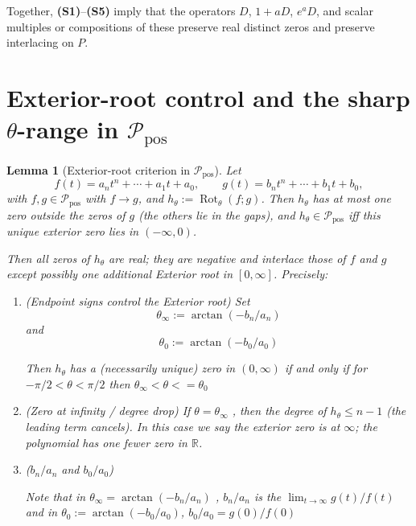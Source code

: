 \documentclass[11pt]{article}
\theoremstyle{breakdef}
\newtheorem{lemma}[theorem]{Lemma}
\begin{document}
Together, \textbf{(S1)}--\textbf{(S5)} imply that the operators
$D$, $1+aD$, $e^aD$, and scalar multiples or
compositions of these preserve real distinct zeros and preserve
interlacing on $P$.


\section{Exterior-root control and the sharp $\theta$-range in $\mathcal{P}_{\mathrm{pos}}$}

\begin{lemma}[Exterior-root criterion in $\mathcal{P}_{\mathrm{pos}}$]\label{lem:exterior-root-Ppos}
Let 
\[
f(t)=a_n t^n+\cdots+a_1 t+a_0,\qquad 
g(t)=b_n t^n+\cdots+b_1 t+b_0,
\]
with  $f,g\in\mathcal{P}_{\mathrm{pos}}$ with $f\to g$, and $h_\theta:=\operatorname{Rot}_\theta(f;g)$. Then $h_\theta$ has at most one zero outside the zeros of $g$ (the others lie in the gaps), and $h_\theta\in\mathcal{P}_{\mathrm{pos}}$ iff this unique exterior zero lies in $(-\infty,0)$.

Then all zeros of $h_\theta$ are real; they are negative and interlace those of $f$ and $g$ \emph{except possibly one} additional Exterior root in $[0,\infty]$. Precisely:

\begin{enumerate}[label=\upshape(\roman*)]
\item (\emph{Endpoint signs control the Exterior root}) 
Set 
\[
\theta_{\infty} := \arctan{(-b_n/a_n)}
\]
and
\[
\theta_{0} := \arctan{(-b_0/a_0)}
\]

Then $h_\theta$ has a (necessarily unique) zero in $(0,\infty)$ if and only if for 
$-\pi/2 < \theta < \pi/2$ then $\theta_{\infty} < \theta <= \theta_{0}$

\item (\emph{Zero at infinity / degree drop})
If $\theta=\theta_{\infty}$
, then the degree of 
$ h_{\theta} \le n-1$ 
(the leading term cancels). 
In this case we say the exterior zero is at $\infty$;
 the polynomial has one fewer zero in $\mathbb R$.
\item (\emph{$b_n/a_n$ and $b_0/a_0$})

Note that in $\theta_{\infty} = \arctan{(-b_n/a_n)}$ , $b_n/a_n$ is the $\lim_{t \to \infty}  g(t)/f(t)$ and in $\theta_{0} := \arctan{(-b_0/a_0)}$, $b_0/a_0 = g(0)/f(0)$ 
\end{enumerate}
\end{lemma}
\end{document}
